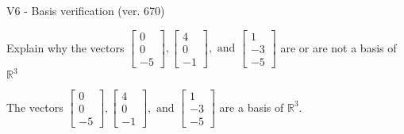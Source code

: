 \begin{exercise}
  \begin{exerciseTitle}V6 - Basis verification (ver. 670)\end{exerciseTitle}
  \begin{exerciseStatement}
    Explain why the vectors \(\left[\begin{array}{r}
0 \\
0 \\
-5
\end{array}\right] , \left[\begin{array}{r}
4 \\
0 \\
-1
\end{array}\right] , \text{ and } \left[\begin{array}{r}
1 \\
-3 \\
-5
\end{array}\right]\) are or are not a basis of \(\mathbb{R}^3\)	


  \end{exerciseStatement}
  \begin{exerciseAnswer}
   The vectors \(\left[\begin{array}{r}
0 \\
0 \\
-5
\end{array}\right] , \left[\begin{array}{r}
4 \\
0 \\
-1
\end{array}\right] , \text{ and } \left[\begin{array}{r}
1 \\
-3 \\
-5
\end{array}\right]\) 
  	 are  a basis of \(\mathbb{R}^3\).
  


  \end{exerciseAnswer}
\end{exercise}